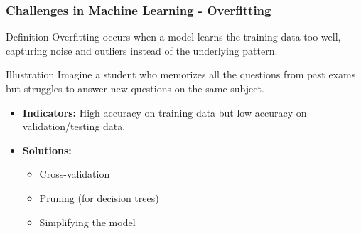 \documentclass[aspectratio=169]{beamer}
\begin{document}
\begin{frame}[fragile]
    \frametitle{Challenges in Machine Learning - Overfitting}
    \begin{block}{Definition}
        Overfitting occurs when a model learns the training data too well, capturing noise and outliers instead of the underlying pattern.
    \end{block}
    
    \begin{block}{Illustration}
        Imagine a student who memorizes all the questions from past exams but struggles to answer new questions on the same subject.
    \end{block}
    
    \begin{itemize}
        \item \textbf{Indicators:} High accuracy on training data but low accuracy on validation/testing data.
        \item \textbf{Solutions:} 
            \begin{itemize}
                \item Cross-validation
                \item Pruning (for decision trees)
                \item Simplifying the model
            \end{itemize}
    \end{itemize}
\end{frame}
\end{document}
